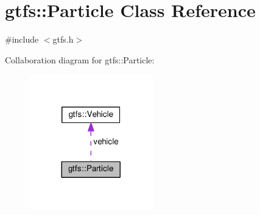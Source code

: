 \hypertarget{classgtfs_1_1Particle}{}\section{gtfs\+:\+:Particle Class Reference}
\label{classgtfs_1_1Particle}


{\ttfamily \#include $<$gtfs.\+h$>$}



Collaboration diagram for gtfs\+:\+:Particle\+:\nopagebreak
\begin{figure}[H]
\begin{center}
\leavevmode
\includegraphics[width=152pt]{classgtfs_1_1Particle__coll__graph}
\end{center}
\end{figure}
